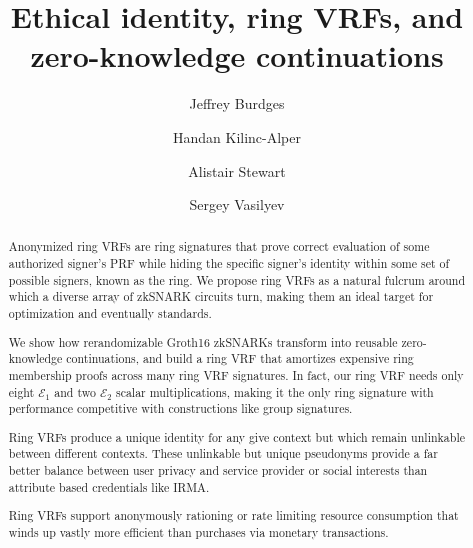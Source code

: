 \documentclass[runningheads,evcountsame,a4paper,11pt,orivec]{llncs}
\title{Ethical identity, ring VRFs, and zero-knowledge continuations}
\author{Jeffrey Burdges \and Handan Kilinc-Alper \and Alistair Stewart \and Sergey Vasilyev}
\date{}
\begin{document}
	
\maketitle

\begin{abstract}
Anonymized ring VRFs are ring signatures that prove correct evaluation of some authorized signer's PRF while hiding the specific signer's identity within some set of possible signers, known as the ring.  We propose ring VRFs as a natural fulcrum around which a diverse array of zkSNARK circuits turn, making them an ideal target for optimization and eventually standards.

\smallskip

We show how rerandomizable Groth16 zkSNARKs transform into reusable zero-knowledge continuations, and build a ring VRF that amortizes expensive ring membership proofs across many ring VRF signatures.
In  fact, our ring VRF needs only eight $\mathcal{E}_1$ and two $\mathcal{E}_2$ scalar multiplications, making it the only ring signature with performance competitive with constructions like group signatures.

\smallskip

Ring VRFs produce a unique identity for any give context but which remain unlinkable between different contexts.  These unlinkable but unique pseudonyms provide a far better balance between user privacy and service provider or social interests than attribute based credentials like IRMA.

\smallskip

Ring VRFs support anonymously rationing or rate limiting resource consumption that winds up vastly more efficient than purchases via monetary transactions. 
\end{abstract}




% 















\end{document}
